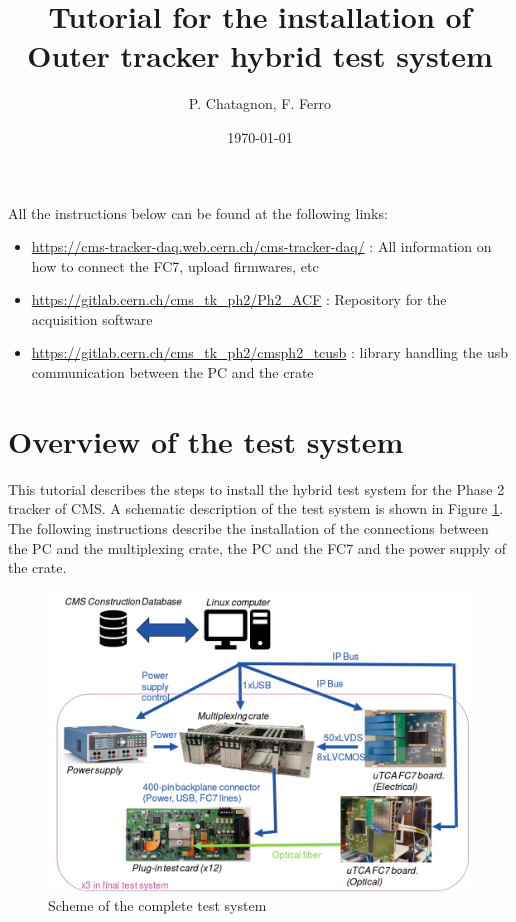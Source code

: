\documentclass[10pt,a4paper]{article}
\begin{document}
\title{Tutorial for the installation of Outer tracker hybrid test system}
\author{P. Chatagnon, F. Ferro}
\date{\today} 

\maketitle

All the instructions below can be found at the following links:
\begin{itemize}
\item  \url{https://cms-tracker-daq.web.cern.ch/cms-tracker-daq/} : All information on how to connect the FC7, upload firmwares, etc
\item  \url{https://gitlab.cern.ch/cms_tk_ph2/Ph2_ACF} : Repository for the acquisition software
\item  \url{https://gitlab.cern.ch/cms_tk_ph2/cmsph2_tcusb} : library handling the usb communication between the PC and the crate
\end{itemize}

\section{Overview of the test system}

This tutorial describes the steps to install the hybrid test system for the Phase 2 tracker of CMS. A schematic description of the test system is shown in Figure \ref{TestSchematic}. The following instructions describe the installation of the connections between the PC and the multiplexing crate, the PC and the FC7 and the power supply of the crate. 
\begin{figure}[h!]
 \includegraphics[width=\linewidth]{TestOverview.png} 
  \caption{Scheme of the complete test system}
  \label{TestSchematic}
\end{figure}
\end{document}
